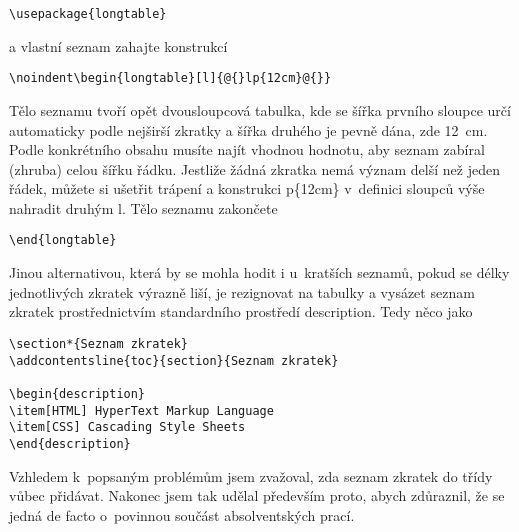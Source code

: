 \documentclass[FM,DP]{tulthesis}
\newcommand{\argument}[1]{{\ttfamily\color{\tulcolor}#1}}
\newenvironment{myquote}{\begin{list}{}{\setlength\leftmargin\parindent}\item[]}{\end{list}}
\newenvironment{listing}{\begin{myquote}\color{\tulcolor}}{\end{myquote}}
\begin{document}
\begin{listing}
\begin{verbatim}
\usepackage{longtable}
\end{verbatim}
\end{listing}

a vlastní seznam zahajte konstrukcí

\begin{listing}
\begin{verbatim}
\noindent\begin{longtable}[l]{@{}lp{12cm}@{}}
\end{verbatim}
\end{listing}

Tělo seznamu tvoří opět dvousloupcová tabulka, kde se šířka prvního sloupce
určí automaticky podle nejširší zkratky a šířka druhého je pevně dána, zde
12~cm. Podle konkrétního obsahu musíte najít vhodnou hodnotu, aby seznam
zabíral (zhruba) celou šířku řádku. Jestliže žádná zkratka nemá význam delší
než jeden řádek, můžete si ušetřit trápení a konstrukci \argument{p\{12cm\}}
v~definici sloupců výše nahradit druhým \argument{l}. Tělo seznamu zakončete

\begin{listing}
\begin{verbatim}
\end{longtable}
\end{verbatim}
\end{listing}

Jinou alternativou, která by se mohla hodit i u~kratších seznamů, pokud se
délky jednotlivých zkratek výrazně liší, je rezignovat na tabulky a vysázet
seznam zkratek prostřednictvím standardního prostředí \argument{description}.
Tedy něco jako

\begin{listing}
\begin{verbatim}
\section*{Seznam zkratek}
\addcontentsline{toc}{section}{Seznam zkratek}

\begin{description}
\item[HTML] HyperText Markup Language
\item[CSS] Cascading Style Sheets
\end{description}
\end{verbatim}
\end{listing}

Vzhledem k~popsaným problémům jsem zvažoval, zda seznam zkratek do třídy vůbec
přidávat. Nakonec jsem tak udělal především proto, abych zdůraznil, že se jedná
de facto o~povinnou součást absolventských prací.
\end{document}
